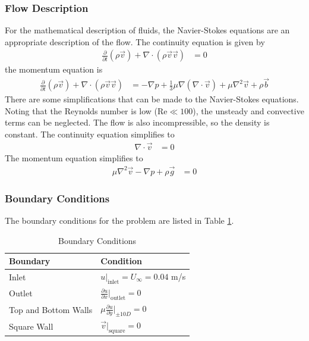 \subsubsection{Flow Description}
For the mathematical description of fluids, the Navier-Stokes equations are an appropriate description of the flow. The continuity equation is given by
\begin{align*}
    \frac{\partial}{\partial t} (\rho \vec{v}) + \nabla \cdot (\rho \vec{v} \vec{v}) &= 0
\end{align*}
the momentum equation is 
\begin{align*}
    \frac{\partial}{\partial t} (\rho \vec{v}) + \nabla \cdot (\rho \vec{v} \vec{v}) &= -\nabla p + \frac{1}{3} \mu \nabla (\nabla \cdot \vec{v}) + \mu \nabla^2 \vec{v} + \rho \vec{b}
\end{align*}
There are some simplifications that can be made to the Navier-Stokes equations. Noting that the Reynolds number is low ($\text{Re} \ll 100$), the unsteady and convective terms can be neglected. The flow is also incompressible, so the density is constant. The continuity equation simplifies to
\begin{align*}
    \nabla \cdot \vec{v} &= 0
\end{align*}
The momentum equation simplifies to
\begin{align*}
    \mu \nabla^2 \vec{v} - \nabla p + \rho \vec{g} &= 0
\end{align*}

\subsubsection{Boundary Conditions}
The boundary conditions for the problem are listed in Table \ref{tab:boundary_conditions}.
\begin{table}[H]
    \centering
    \caption{Boundary Conditions}
    \label{tab:boundary_conditions}
    \begin{tabular}{ll}
        \toprule
        Boundary & Condition \\
        \midrule
        Inlet & $\displaystyle u|_{\text{inlet}} = U_\infty = 0.04$ m/s \\[2ex]
        Outlet & $\displaystyle \frac{\partial u}{\partial x}\bigg|_{\text{outlet}} = 0$ \\[2ex]
        Top and Bottom Walls & $\displaystyle \mu \frac{\partial u}{\partial y}\bigg|_{\pm 10D} = 0$ \\[2ex]
        Square Wall & $\displaystyle \vec{v}|_{\text{square}} = 0$ \\
        \bottomrule
    \end{tabular}
\end{table}

